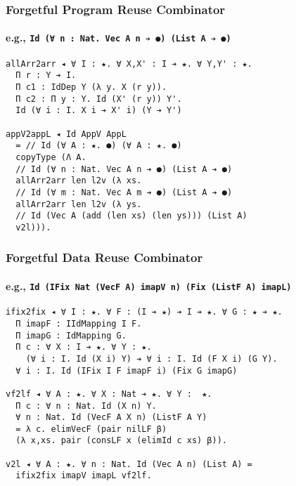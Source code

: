 \documentclass[mathserif,usenames,dvipsnames]{beamer}
\begin{document}
\begin{frame}[fragile]
\frametitle{Forgetful Program Reuse Combinator}
\framesubtitle{e.g., \texttt{Id (∀ n : Nat. Vec A n ➔ ●) (List A ➔ ●)}}
  
\begin{verbatim}
allArr2arr ◂ ∀ I : ★. ∀ X,X' : I ➔ ★. ∀ Y,Y' : ★.
  Π r : Y ➔ I.
  Π c1 : IdDep Y (λ y. X (r y)).
  Π c2 : Π y : Y. Id (X' (r y)) Y'.
  Id (∀ i : I. X i ➔ X' i) (Y ➔ Y')

appV2appL ◂ Id AppV AppL
  = // Id (∀ A : ★. ●) (∀ A : ★. ●)
  copyType (Λ A. 
  // Id (∀ n : Nat. Vec A n ➔ ●) (List A ➔ ●)
  allArr2arr len l2v (λ xs. 
  // Id (∀ m : Nat. Vec A m ➔ ●) (List A ➔ ●)
  allArr2arr len l2v (λ ys. 
  // Id (Vec A (add (len xs) (len ys))) (List A)
  v2l))).
\end{verbatim}

\end{frame}

\begin{frame}[fragile]
\frametitle{Forgetful Data Reuse Combinator}
\framesubtitle{e.g., \texttt{Id (IFix Nat (VecF A) imapV n) (Fix (ListF A) imapL)}}
  
\begin{verbatim}
ifix2fix ◂ ∀ I : ★. ∀ F : (I ➔ ★) ➔ I ➔ ★. ∀ G : ★ ➔ ★. 
  Π imapF : IIdMapping I F. 
  Π imapG : IdMapping G.
  Π c : ∀ X : I ➔ ★. ∀ Y : ★. 
    (∀ i : I. Id (X i) Y) ➔ ∀ i : I. Id (F X i) (G Y).
  ∀ i : I. Id (IFix I F imapF i) (Fix G imapG)

vf2lf ◂ ∀ A : ★. ∀ X : Nat ➔ ★. ∀ Y :  ★. 
  Π c : ∀ n : Nat. Id (X n) Y.
  ∀ n : Nat. Id (VecF A X n) (ListF A Y)
  = λ c. elimVecF (pair nilLF β)
  (λ x,xs. pair (consLF x (elimId c xs) β)).

v2l ◂ ∀ A : ★. ∀ n : Nat. Id (Vec A n) (List A) =
  ifix2fix imapV imapL vf2lf. 
\end{verbatim}

\end{frame}
\end{document}
